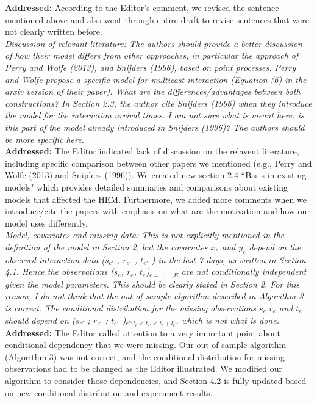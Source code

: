 \documentclass[12pt]{article}
\newcommand{\grey}[1]{{\color{mygrey}#1}}
\theoremstyle{definition}
\begin{document}
\noindent \textcolor{MyGreen}{\textbf{Addressed:}} According to the Editor's comment, we revised the sentence mentioned above and also went through entire draft to revise sentences that were not clearly written before. \\


 \grey{\emph{ Discussion of relevant literature: The authors should provide a better discussion of how their model differs from other approaches, in particular the approach of Perry and Wolfe (2013), and Snijders (1996), based on point processes. Perry and Wolfe propose a specific model for multicast interaction (Equation (6) in the arxiv version of their paper). What are the differences/advantages between both constructions? In Section 2.3, the author cite Snijders (1996) when they introduce the model for the interaction arrival times. I am not sure what is meant here: is this part of the model already introduced in Snijders (1996)? The authors should be more specific here.}}\\

\noindent \textcolor{MyGreen}{\textbf{Addressed:}} The Editor indicated lack of discussion on the relavent literature, including specific comparison between other papers we mentioned (e.g., Perry and Wolfe (2013) and Snijders (1996)). We created new section 2.4 ``Basis in existing models" which provides detailed summaries and comparisons about existing models that affected the HEM. Furthermore, we added more comments when we introduce/cite the papers with emphasis on what are the motivation and how our model uses differently.\\

 \grey{\emph{ Model, covariates and missing data: This is not explicitly mentioned in the definition of the model in Section 2, but the covariates $x_e$ and $y_e$ depend on the observed interaction data ($s_{e'}$ , $r_{e'}$ , $t_{e'}$ ) in the last 7 days, as written in Section 4.1. Hence the observations ($s_e$, $r_e$, $t_e$)$_{e=1,...,E}$ are not conditionally independent given the model parameters. This should be clearly stated in Section 2. For this reason, I do not think that the out-of-sample algorithm described in Algorithm 3 is correct. The conditional distribution for the missing observations $s_e$,$r_e$ and $t_e$ should depend on ($s_{e'}$ ; $r_{e'}$ ; $t_{e'}$ )$_{e': t_e < t_{e'} < t_{e} + l_e }$, which is not what is done. }}\\

\noindent \textcolor{MyGreen}{\textbf{Addressed:}} The Editor called attention to a very important point about conditional dependency that we were missing. Our out-of-sample algorithm (Algorithm 3) was not correct, and the conditional distribution for missing observations had to be changed as the Editor illustrated. We modified our algorithm to consider those dependencies, and Section 4.2 is fully updated based on new conditional distribution and experiment results. \\
\end{document}
